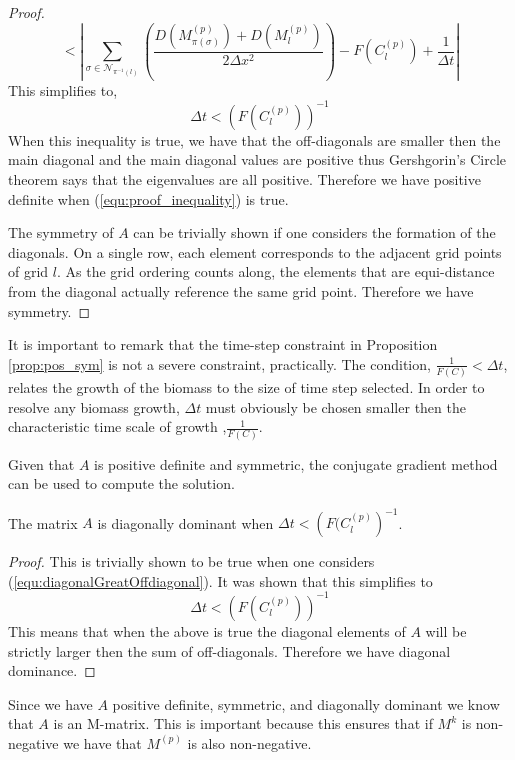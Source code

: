 \begin{proof}
\begin{equation}
    <
    \left| \sum_{\sigma \in \mathcal{N}_{\pi^{-1}(l)}} \left( 
      \frac{D(M_{\pi(\sigma)}^{(p)}) + D(M_l^{(p)})}{2\Delta x^2} \right)
      - F(C_l^{(p)}) + \frac{1}{\Delta t} \right|
  \end{equation}
  This simplifies to,
  \begin{equation} \label{equ:proof_inequality}
    \Delta t < \left( { F(C^{(p)}_{l}) } \right)^{-1} 
  \end{equation}
  When this inequality is true, we have that the off-diagonals are smaller then the main diagonal and the main diagonal values are positive thus Gershgorin's Circle theorem says that the eigenvalues are all positive.
  Therefore we have positive definite when (\ref{equ:proof_inequality}) is true.

  The symmetry of $A$ can be trivially shown if one considers the formation of the diagonals.
  On a single row, each element corresponds to the adjacent grid points of grid $l$.
  As the grid ordering counts along, the elements that are equi-distance from the diagonal actually reference the same grid point. 
  Therefore we have symmetry. 
\end{proof} 

It is important to remark that the time-step constraint in Proposition \ref{prop:pos_sym} is not a severe constraint, practically.
The condition, $\frac{1}{F(C)} < \Delta t$, relates the growth of the biomass to the size of time step selected.
In order to resolve any biomass growth, $\Delta t$ must obviously be chosen smaller then the characteristic time scale of growth ,$\frac{1}{F(C)}$.

Given that $A$ is positive definite and symmetric, the conjugate gradient method can be used to compute the solution.

\begin{prop}
  The matrix $A$ is diagonally dominant when $\Delta t < \left( { F(C^{(p)}_{l}} \right)^{-1}$.
\end{prop}
\begin{proof}
  This is trivially shown to be true when one considers (\ref{equ:diagonalGreatOffdiagonal}).
  It was shown that this simplifies to 
  \begin{equation}
    \Delta t < \left( { F(C^{(p)}_{l}) } \right)^{-1}
  \end{equation}
  This means that when the above is true the diagonal elements of $A$ will be strictly larger then the sum of off-diagonals.
  Therefore we have diagonal dominance.
\end{proof}
Since we have $A$ positive definite, symmetric, and diagonally dominant we know that $A$ is an M-matrix.
This is important because this ensures that if $M^k$ is non-negative we have that $M^{(p)}$ is also non-negative.


